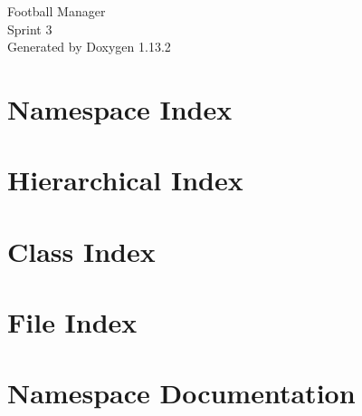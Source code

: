 \documentclass[twoside]{book}
\newcommand{\+}{\discretionary{\mbox{\scriptsize$\hookleftarrow$}}{}{}}
\newcommand{\clearemptydoublepage}{%
    \newpage{\pagestyle{empty}\cleardoublepage}%
  }
\begin{document}
  \raggedbottom
    \hypersetup{pageanchor=false,
                bookmarksnumbered=true,
                pdfencoding=unicode
               }
  \begin{titlepage}
  \vspace*{7cm}
  \begin{center}%
  {\Large Football Manager}\\
  [1ex]\large Sprint 3 \\
  \vspace*{1cm}
  {\large Generated by Doxygen 1.13.2}\\
  \end{center}
  \end{titlepage}
  \clearemptydoublepage
  \tableofcontents
  \clearemptydoublepage
  \hypersetup{pageanchor=true}


\chapter{Namespace Index}

\chapter{Hierarchical Index}

\chapter{Class Index}

\chapter{File Index}

\chapter{Namespace Documentation}







\end{document}
